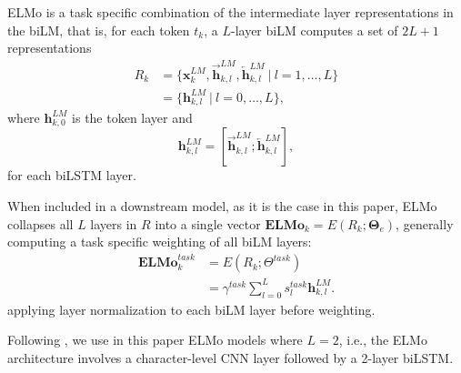 ELMo is a task specific combination of the intermediate layer representations in the biLM, that is,
for each token $t_k$, a $L$-layer biLM computes a set of $2L + 1$ representations
\begin{align*}
    R_k & =  \{\mathbf{x}^{LM}_{k}, \overrightarrow{\mathbf{h}}^{LM}_{k,l}, \overleftarrow{\mathbf{h}}^{LM}_{k,l} \ |\  l =1, \ldots, L \} \\
        & =  \{\mathbf{h}^{LM}_{k,l}\ | \ l=0, \ldots, L\},
\end{align*}
where $\mathbf{h}^{LM}_{k,0}$ is the token layer and
\[
    \mathbf{h}^{LM}_{k,l} = [\overrightarrow{\mathbf{h}}^{LM}_{k,l}; \overleftarrow{\mathbf{h}}^{LM}_{k,l}],
\]
for each biLSTM layer.


When included in a downstream model, as it is the case in this paper, ELMo collapses all $L$ layers in $R$ into a single vector $\mathbf{ELMo}_k = E(R_k; \mathbf{\Theta}_e)$, generally computing a task specific weighting of all biLM layers:
\begin{align*}
    \mathbf{ELMo}^{task}_k & = E(R_k; \Theta^{task})                                       \\
                           & =\gamma^{task} \sum_{l=0}^L s^{task}_l \mathbf{h}^{LM}_{k,l}.
\end{align*}
applying layer normalization to each biLM layer before weighting.

Following \cite{peters-etal-2018-deep}, we use in this paper ELMo models where $L=2$, i.e., the ELMo architecture involves a character-level CNN layer followed by a 2-layer biLSTM.
